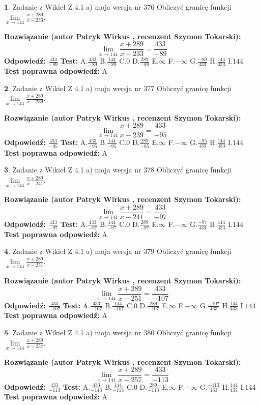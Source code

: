 \documentclass[12pt, a4paper]{article}
\theoremstyle{definition} %
\newtheorem{zad}{}
\newcommand{\zadStart}[1]{\begin{zad}#1\newline}
\newcommand{\zadStop}{\end{zad}}
\newcommand{\rozwStart}[2]{\noindent \textbf{Rozwiązanie (autor #1 , recenzent #2): }\newline}
\newcommand{\rozwStop}{\newline}
\newcommand{\odpStart}{\noindent \textbf{Odpowiedź:}\newline}
\newcommand{\odpStop}{\newline}
\newcommand{\testStart}{\noindent \textbf{Test:}\newline}
\newcommand{\testStop}{\newline}
\newcommand{\kluczStart}{\noindent \textbf{Test poprawna odpowiedź:}\newline}
\newcommand{\kluczStop}{\newline}
\begin{document}
\zadStart{Zadanie z Wikieł Z 4.1 a) moja wersja nr 376}
Obliczyć granicę funkcji $\lim\limits_{x\to144}\frac{x+289}{x-233}$.
\zadStop
\rozwStart{Patryk Wirkus}{Szymon Tokarski}
$$\lim\limits_{x\to144}\frac{x+289}{x-233} = \frac{433}{-89}$$
\rozwStop
\odpStart
$\frac{433}{-89}$
\odpStop
\testStart
A.$\frac{433}{-89}$
B.$\frac{144}{-89}$
C.$0$
D.$\frac{289}{-89}$
E.$\infty$
F.$-\infty$
G.$\frac{-89}{433}$
H.$\frac{144}{433}$
I.$144$
\testStop
\kluczStart
A
\kluczStop



\zadStart{Zadanie z Wikieł Z 4.1 a) moja wersja nr 377}
Obliczyć granicę funkcji $\lim\limits_{x\to144}\frac{x+289}{x-239}$.
\zadStop
\rozwStart{Patryk Wirkus}{Szymon Tokarski}
$$\lim\limits_{x\to144}\frac{x+289}{x-239} = \frac{433}{-95}$$
\rozwStop
\odpStart
$\frac{433}{-95}$
\odpStop
\testStart
A.$\frac{433}{-95}$
B.$\frac{144}{-95}$
C.$0$
D.$\frac{289}{-95}$
E.$\infty$
F.$-\infty$
G.$\frac{-95}{433}$
H.$\frac{144}{433}$
I.$144$
\testStop
\kluczStart
A
\kluczStop



\zadStart{Zadanie z Wikieł Z 4.1 a) moja wersja nr 378}
Obliczyć granicę funkcji $\lim\limits_{x\to144}\frac{x+289}{x-241}$.
\zadStop
\rozwStart{Patryk Wirkus}{Szymon Tokarski}
$$\lim\limits_{x\to144}\frac{x+289}{x-241} = \frac{433}{-97}$$
\rozwStop
\odpStart
$\frac{433}{-97}$
\odpStop
\testStart
A.$\frac{433}{-97}$
B.$\frac{144}{-97}$
C.$0$
D.$\frac{289}{-97}$
E.$\infty$
F.$-\infty$
G.$\frac{-97}{433}$
H.$\frac{144}{433}$
I.$144$
\testStop
\kluczStart
A
\kluczStop



\zadStart{Zadanie z Wikieł Z 4.1 a) moja wersja nr 379}
Obliczyć granicę funkcji $\lim\limits_{x\to144}\frac{x+289}{x-251}$.
\zadStop
\rozwStart{Patryk Wirkus}{Szymon Tokarski}
$$\lim\limits_{x\to144}\frac{x+289}{x-251} = \frac{433}{-107}$$
\rozwStop
\odpStart
$\frac{433}{-107}$
\odpStop
\testStart
A.$\frac{433}{-107}$
B.$\frac{144}{-107}$
C.$0$
D.$\frac{289}{-107}$
E.$\infty$
F.$-\infty$
G.$\frac{-107}{433}$
H.$\frac{144}{433}$
I.$144$
\testStop
\kluczStart
A
\kluczStop



\zadStart{Zadanie z Wikieł Z 4.1 a) moja wersja nr 380}
Obliczyć granicę funkcji $\lim\limits_{x\to144}\frac{x+289}{x-257}$.
\zadStop
\rozwStart{Patryk Wirkus}{Szymon Tokarski}
$$\lim\limits_{x\to144}\frac{x+289}{x-257} = \frac{433}{-113}$$
\rozwStop
\odpStart
$\frac{433}{-113}$
\odpStop
\testStart
A.$\frac{433}{-113}$
B.$\frac{144}{-113}$
C.$0$
D.$\frac{289}{-113}$
E.$\infty$
F.$-\infty$
G.$\frac{-113}{433}$
H.$\frac{144}{433}$
I.$144$
\testStop
\kluczStart
A
\kluczStop
\end{document}
